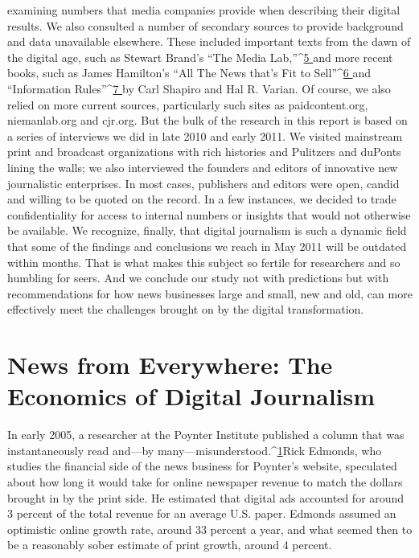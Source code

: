 examining numbers that media companies provide when describing their digital
results. We also consulted a number of secondary sources to provide background
and data unavailable elsewhere. These included important texts from the dawn
of the digital age, such as Stewart Brand’s ``The Media Lab,''^{\href{#endnotes-intro}{5 }}and more recent
books, such as James Hamilton’s ``All The News that’s Fit to Sell''^{\href{#endnotes-intro}{6 }}and ``Information
Rules''^{\href{#endnotes-intro}{7 }}by Carl Shapiro and Hal R. Varian. Of course, we also relied on
more current sources, particularly such sites as paidcontent.org, niemanlab.org
and cjr.org.
But the bulk of the research in this report is based on a series of interviews we
did in late 2010 and early 2011. We visited mainstream print and broadcast organizations
with rich histories and Pulitzers and duPonts lining the walls; we also
interviewed the founders and editors of innovative new journalistic enterprises.
In most cases, publishers and editors were open, candid and willing to be quoted
on the record. In a few instances, we decided to trade confidentiality for access to
internal numbers or insights that would not otherwise be available.
We recognize, finally, that digital journalism is such a dynamic field that some
of the findings and conclusions we reach in May 2011 will be outdated within
months. That is what makes this subject so fertile for researchers and so humbling
for seers. And we conclude our study not with predictions but with recommendations
for how news businesses large and small, new and old, can more effectively
meet the challenges brought on by the digital transformation.

\chapter{News from Everywhere: The Economics of Digital Journalism}
In early 2005, a researcher at the Poynter Institute published a column that was
instantaneously read and—by many—misunderstood.^{\href{#endnotes-ch1}{1}}Rick Edmonds, who studies the financial side of the news business for Poynter’s
website, speculated about how long it would take for online newspaper revenue
to match the dollars brought in by the print side. He estimated that digital
ads accounted for around 3 percent of the total revenue for an average U.S. paper.
Edmonds assumed an optimistic online growth rate, around 33 percent a year,
and what seemed then to be a reasonably sober estimate of print growth, around
4 percent.

